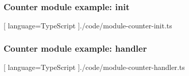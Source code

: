 \begin{frame}
  \frametitle{Counter module example: init}
  \begin{center}
    
    [ language=TypeScript
    ]{./code/module-counter-init.ts}
  \end{center}
\end{frame}

\begin{frame}
  \frametitle{Counter module example: handler}
  \begin{center}
    
    [ language=TypeScript
    ]{./code/module-counter-handler.ts}
  \end{center}
\end{frame}